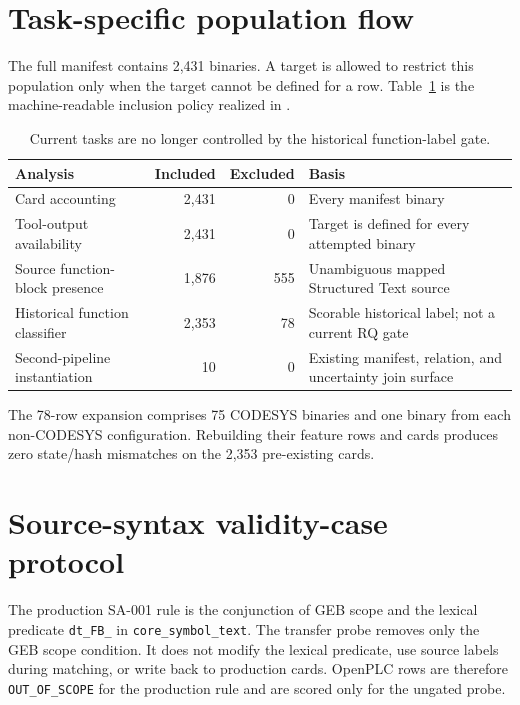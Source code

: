 \documentclass[manuscript,screen,review]{acmart}
\begin{document}
\section{Task-specific population flow}

The full manifest contains 2{,}431 binaries. A target is allowed to restrict this population only when the target cannot be defined for a row. Table~\ref{tab:population_flow} is the machine-readable inclusion policy realized in .

\begin{table}[t]
\centering
\small
\caption{Current tasks are no longer controlled by the historical function-label gate.}
\label{tab:population_flow}
\begin{tabularx}{\textwidth}{>{\raggedright\arraybackslash}Xrr>{\raggedright\arraybackslash}X}
\toprule
Analysis & Included & Excluded & Basis \\
\midrule
Card accounting & 2,431 & 0 & Every manifest binary \\
Tool-output availability & 2,431 & 0 & Target is defined for every attempted binary \\
Source function-block presence & 1,876 & 555 & Unambiguous mapped Structured Text source \\
Historical function classifier & 2,353 & 78 & Scorable historical label; not a current RQ gate \\
Second-pipeline instantiation & 10 & 0 & Existing manifest, relation, and uncertainty join surface \\
\bottomrule
\end{tabularx}
\end{table}

The 78-row expansion comprises 75 CODESYS binaries and one binary from each non-CODESYS configuration. Rebuilding their feature rows and cards produces zero state/hash mismatches on the 2{,}353 pre-existing cards.

\section{Source-syntax validity-case protocol}

The production SA-001 rule is the conjunction of GEB scope and the lexical predicate \texttt{dt\_FB\_} in \texttt{core\_symbol\_text}. The transfer probe removes only the GEB scope condition. It does not modify the lexical predicate, use source labels during matching, or write back to production cards. OpenPLC rows are therefore \texttt{OUT\_OF\_SCOPE} for the production rule and are scored only for the ungated probe.
\end{document}
